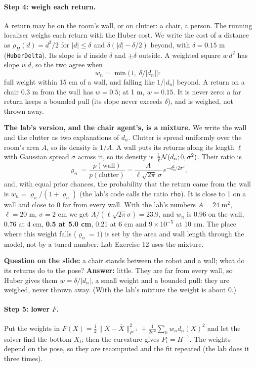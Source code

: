 \documentclass[11pt]{article}
\newcommand{\dens}{\varrho}
\begin{document}
\paragraph{Step 4: weigh each return.} A return may be on the room's wall, or on clutter: a chair, a person. The running localiser weighs each return with the Huber cost. We write the cost of a distance as $\rho_H(d)=d^2/2$ for $|d|\le\delta$ and $\delta(|d|-\delta/2)$ beyond, with $\delta=0.15$ m (\texttt{HuberDelta}). Its slope is $d$ inside $\delta$ and $\pm\delta$ outside. A weighted square $w\,d^2$ has slope $w\,d$, so the two agree when
\[
w_n=\min\!\big(1,\;\delta/|d_n|\big):
\]
full weight within 15 cm of a wall, and falling like $1/|d_n|$ beyond. A return on a chair 0.3 m from the wall has $w=0.5$; at 1 m, $w=0.15$. It is never zero: a far return keeps a bounded pull (its slope never exceeds $\delta$), and is weighed, not thrown away.

\textbf{The lab's version, and the chair agent's, is a mixture.} We write the wall and the clutter as two explanations of $d_n$. Clutter is spread uniformly over the room's area $A$, so its density is $1/A$. A wall puts its returns along its length $\ell$ with Gaussian spread $\sigma$ across it, so its density is $\frac1{\ell}\mathcal{N}(d_n;0,\sigma^2)$. Their ratio is
\[
\dens_n=\frac{p(\text{wall})}{p(\text{clutter})}=\frac{A}{\ell\sqrt{2\pi}\,\sigma}\,e^{-d_n^2/2\sigma^2},
\]
and, with equal prior chances, the probability that the return came from the wall is $w_n=\dens_n/(1+\dens_n)$ (the lab's code calls the ratio \texttt{rho}). It is close to 1 on a wall and close to 0 far from every wall. With the lab's numbers $A=24$ m$^2$, $\ell=20$ m, $\sigma=2$ cm we get $A/(\ell\sqrt{2\pi}\sigma)=23.9$, and $w_n$ is 0.96 on the wall, 0.76 at 4 cm, \textbf{0.5 at 5.0 cm}, 0.21 at 6 cm and $9\times10^{-5}$ at 10 cm. The place where this weight falls ($\dens_n=1$) is set by the area and wall length through the model, not by a tuned number. Lab Exercise 12 uses the mixture.

\textbf{Question on the slide:} a chair stands between the robot and a wall; what do its returns do to the pose? \textbf{Answer:} little. They are far from every wall, so Huber gives them $w=\delta/|d_n|$, a small weight and a bounded pull: they are weighed, never thrown away. (With the lab's mixture the weight is about 0.)

\paragraph{Step 5: lower $F$.} Put the weights in $F(X)=\tfrac12\|X-\bar X\|^2_{\bar P^{-1}}+\frac1{2\sigma^2}\sum_n w_nd_n(X)^2$ and let the solver find the bottom $X_t$; then the curvature gives $P_t=H^{-1}$. The weights depend on the pose, so they are recomputed and the fit repeated (the lab does it three times).
\end{document}
